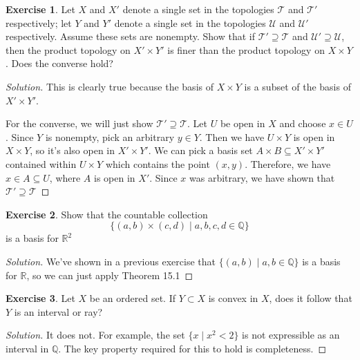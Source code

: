 \documentclass{article}
\theoremstyle{definition}
\newtheorem{exercise}{Exercise}[section]
\begin{document}
\begin{exercise}
  Let $X$ and $X'$ denote a single set in the topologies $\mathcal{T}$ and $\mathcal{T}'$ respectively; let $Y$ and $Y'$ denote a single set in the topologies $\mathcal{U}$ and $\mathcal{U}'$ respectively. Assume these sets are nonempty. Show that if $\mathcal{T}'\supseteq\mathcal{T}$ and $\mathcal{U}'\supseteq\mathcal{U}$, then the product topology on $X'\times Y'$ is finer than the product topology on $X\times Y$. Does the converse hold?
\end{exercise}
\begin{proof}[Solution]
  This is clearly true because the basis of $X\times Y$ is a subset of the basis of $X'\times Y'$.

  For the converse, we will just show $\mathcal{T}'\supseteq\mathcal{T}$. Let $U$ be open in $X$ and choose $x\in U$. Since $Y$ is nonempty, pick an arbitrary $y\in Y$. Then we have $U\times Y$ is open in $X\times Y$, so it's also open in $X'\times Y'$. We can pick a basis set $A\times B\subseteq X'\times Y'$ contained within $U\times Y$ which contains the point $(x,y)$. Therefore, we have $x\in A\subseteq U$, where $A$ is open in $X'$. Since $x$ was arbitrary, we have shown that $\mathcal{T}'\supseteq\mathcal{T}$
\end{proof}


\begin{exercise}
  Show that the countable collection
  $$\{(a,b)\times (c,d)\mid a,b,c,d\in\mathbb{Q}\}$$
  is a basis for $\mathbb{R}^2$
\end{exercise}
\begin{proof}[Solution]
  We've shown in a previous exercise that $\{(a,b)\mid a,b\in\mathbb{Q}\}$ is a basis for $\mathbb{R}$, so we can just apply Theorem 15.1
\end{proof}


\begin{exercise}
  Let $X$ be an ordered set. If $Y\subset X$ is convex in $X$, does it follow that $Y$ is an interval or ray?
\end{exercise}
\begin{proof}[Solution]
  It does not. For example, the set $\{x\mid x^2 < 2\}$ is not expressible as an interval in $\mathbb{Q}$. The key property required for this to hold is completeness.
\end{proof}
\end{document}
